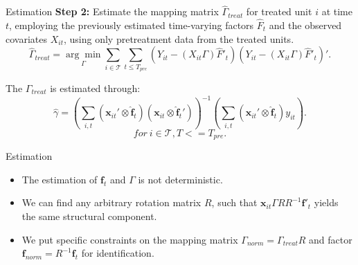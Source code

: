 \documentclass{beamer}
\begin{document}
\begin{frame}{Estimation}
    \textbf{Step 2:} Estimate the mapping matrix $\hat{\Gamma}_{treat}$ for treated unit $i$ at time $t$, employing the previously estimated time-varying factors $\hat{F}_t$ and the observed covariates $X_{it}$, using only pretreatment data from the treated units.
    \begin{equation*}
    \hat{\Gamma}_{treat} = \underset{\Gamma}{\arg\min} \sum_{i \in \mathcal{T}} \sum_{t \leq T_{pre}} \left( Y_{it} - (X_{it} \Gamma) \hat{F}'_{t} \right) \left( Y_{it} - (X_{it} \Gamma) \hat{F}'_{t} \right)'.
    \end{equation*}
    
    The $\Gamma_{treat}$ is estimated through:
    \begin{equation*}
        \hat{\gamma} = \left( \sum_{i,t} (\boldsymbol{x}_{it}' \otimes \boldsymbol{\hat{f}}_t) (\boldsymbol{x}_{it} \otimes \boldsymbol{\hat{f}}_t') \right)^{-1} \left( \sum_{i,t} (\boldsymbol{x}_{it}' \otimes \boldsymbol{\hat{f}}_t) y_{it} \right).
    \end{equation*}
    $$for \ i \in \mathcal{T}, T<= T_{pre}.$$
\end{frame}

\begin{frame}{Estimation}
    \begin{itemize}
        \item The estimation of $\boldsymbol{f}_{t}$ and $\Gamma$ is not deterministic.
        \item We can find any arbitrary rotation matrix $R$, such that $\boldsymbol{x}_{it}\Gamma R R^{-1}\boldsymbol{f}'_{t}$ yields the same structural component.
        \item We put specific constraints on the mapping matrix $\Gamma_{norm} = \Gamma_{treat}R$ and factor $\boldsymbol{f}_{norm} = R^{-1}\boldsymbol{f}_t$ for identification.
    \end{itemize}
\end{frame}
\end{document}
